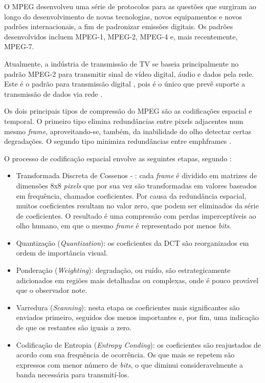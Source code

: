 O MPEG desenvolveu uma série de protocolos para as questões que surgiram ao longo do desenvolvimento de novas tecnologias, novos equipamentos e novos padrões internacionais, a fim de padronizar emissões digitais. Os padrões desenvolvidos incluem MPEG-1, MPEG-2, MPEG-4 e, mais recentemente, MPEG-7.

Atualmente, a indústria de transmissão de TV se baseia principalmente no padrão MPEG-2 para transmitir sinal de vídeo digital, áudio e dados pela rede. Este é o padrão para transmissão digital \cite{mpeg2ref}, pois é o único que prevê suporte a transmissão de dados via rede \cite{mpeg2ref}.

Os dois principais tipos de compressão do MPEG são as codificações espacial e temporal. O primeiro tipo elimina redundâncias entre pixels adjacentes num mesmo \emph{frame}, aproveitando-se, também, da inabilidade do olho detectar certas degradações. O segundo tipo minimiza redundâncias entre emph{frames} \cite{mpeg2ref}.

O processo de codificação espacial envolve as seguintes etapas, segundo \cite{mpeg2ref}:
\begin{itemize}
    \item Transformada Discreta de Cossenos - : cada \emph{frame} é dividido em matrizes de dimensões 8x8 \emph{pixels} que por sua vez são transformadas em valores baseados em frequência, chamados coeficientes. Por causa da redundância espacial, muitos coeficientes resultam no valor zero, que podem ser eliminados da série de coeficientes. O resultado é uma compressão com perdas imperceptíveis ao olho humano, em que o mesmo \emph{frame} é representado por menos \emph{bits}.
    \item Quantização (\emph{Quantization}): os coeficientes da DCT são reorganizados em ordem de importância visual.
    \item Ponderação (\emph{Weighting}): degradação, ou ruído, são estrategicamente adicionados em regiões mais detalhadas ou complexas, onde é pouco provável que o observador note. 
    \item Varredura (\emph{Scanning}): nesta etapa os coeficientes mais significantes são enviados primeiro, seguidos dos menos importantes e, por fim, uma indicação de que os restantes são iguais a zero.
    \item Codificação de Entropia (\emph{Entropy Conding}): os coeficientes são reajustados de acordo com sua frequência de ocorrência. Os que mais se repetem são expressos com menor número de \emph{bits}, o que diminui consideravelmente a banda necessária para transmití-los.
\end{itemize}

